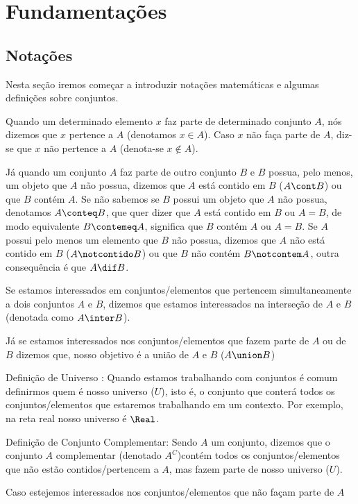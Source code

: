 \section{Fundamentações}
    \subsection{Notações}
    Nesta seção iremos começar a introduzir notações matemáticas e algumas definições sobre conjuntos.
    
    Quando um determinado elemento $x$ faz parte de determinado conjunto $A$, nós dizemos que $x$ pertence a $A$ (denotamos $x \in A$). Caso $x$ não faça parte de $A$, diz-se que $x$ não pertence a $A$ (denota-se  $x \notin A$).
    
    Já quando um conjunto $A$ faz parte de outro conjunto $B$ e $B$ possua, pelo menos, um objeto que $A$ não possua, dizemos que $A$ está contido em $B$ ($\space A \cont B$) ou que $B$ contém $A$. Se não sabemos se $B$ possui um objeto que $A$ não possua, denotamos $A \conteq B$, que quer dizer que $A$ está contido em $B$ ou $A=B$, de modo equivalente $B \contemeq A$, significa que $B$ contém $A$ ou $A=B$. Se $A$ possui pelo menos um elemento que $B$ não possua, dizemos que $A$ não está contido em $B$ ($A \notcontido B$) ou que $B$ não contém $B\notcontem A$, outra consequência é que $A \dif B$. 
    
    Se estamos interessados em conjuntos/elementos que pertencem simultaneamente a dois conjuntos $A$ e $B$, dizemos que estamos interessados na interseção de $A$ e $B$ (denotada como $A \inter B$).
    
    Já se estamos interessados nos conjuntos/elementos que fazem parte de $A$ ou de $B$ dizemos que, nosso objetivo é a união de $A$ e $B$ ($A \union B$)
    
    Definição de Universo : Quando estamos trabalhando com conjuntos é comum definirmos quem é nosso universo ($U$), isto é, o conjunto que conterá todos os conjuntos/elementos que estaremos trabalhando em um contexto. Por exemplo, na reta real nosso universo é $\Real$.
    
    Definição de Conjunto Complementar: Sendo $A$ um conjunto, dizemos que o conjunto $A$ complementar (denotado $A^C$)contém todos os conjuntos/elementos que não estão contidos/pertencem a $A$, mas fazem parte de nosso universo ($U$).
    
    Caso estejemos interessados nos conjuntos/elementos que não façam parte de $A$ 
    
    
